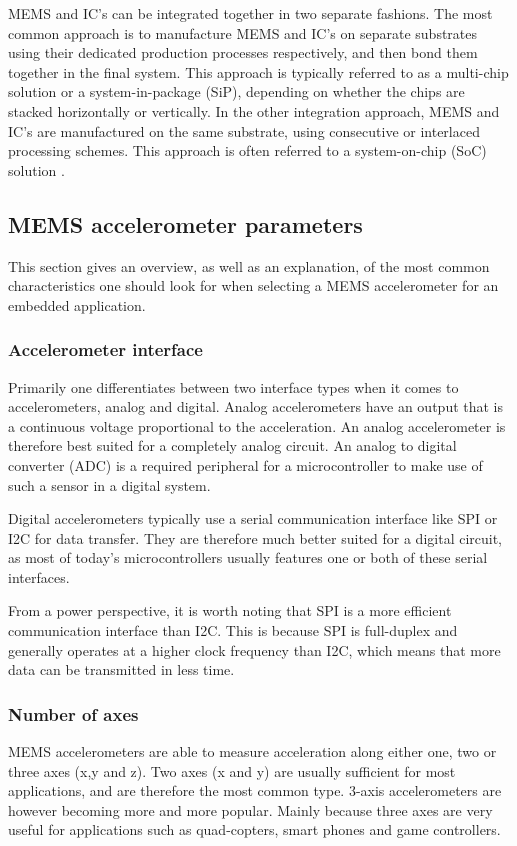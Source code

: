 MEMS and IC's can be integrated together in two separate fashions. The most common approach is to manufacture MEMS and IC's on separate substrates using their dedicated production processes respectively, and then bond them together in the final system. This approach is typically referred to as a multi-chip solution or a system-in-package (SiP), depending on whether the chips are stacked horizontally or vertically. In the other integration approach, MEMS and IC's are manufactured on the same substrate, using consecutive or interlaced processing schemes. This approach is often referred to a system-on-chip (SoC) solution \cite{fischer15}. 

\subsection{MEMS accelerometer parameters}

This section gives an overview, as well as an explanation, of the most common characteristics one should look for when selecting a MEMS accelerometer for an embedded application.

\subsubsection{Accelerometer interface}

Primarily one differentiates between two interface types when it comes to accelerometers, analog and digital. Analog accelerometers have an output that is a continuous voltage proportional to the acceleration. An analog accelerometer is therefore best suited for a completely analog circuit. An analog to digital converter (ADC) is a required peripheral for a microcontroller to make use of such a sensor in a digital system.

Digital accelerometers typically use a serial communication interface like SPI or I2C for data transfer. They are therefore much better suited for a digital circuit, as most of today's microcontrollers usually features one or both of these serial interfaces.

From a power perspective, it is worth noting that SPI is a more efficient communication interface than I2C. This is because SPI is full-duplex and generally operates at a higher clock frequency than I2C, which means that more data can be transmitted in less time. 

\subsubsection{Number of axes}
MEMS accelerometers are able to measure acceleration along either one, two or three axes (x,y and z). Two axes (x and y) are usually sufficient for most applications, and are therefore the most common type. 3-axis accelerometers are however becoming more and more popular. Mainly because three axes are very useful for applications such as quad-copters, smart phones and game controllers.

